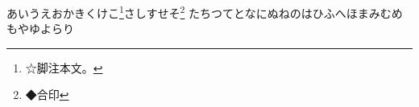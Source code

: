 \documentclass[pdflatex,tate,paper=b5j,line_length=20zw]{jlreq}
\begin{document}
あいうえおかきくけこ\footnote{☆脚注本文。}さしすせそ\footnote{◆合印}\newline
たちつてとなにぬねのはひふへほまみむめもやゆよらり
\end{document}
